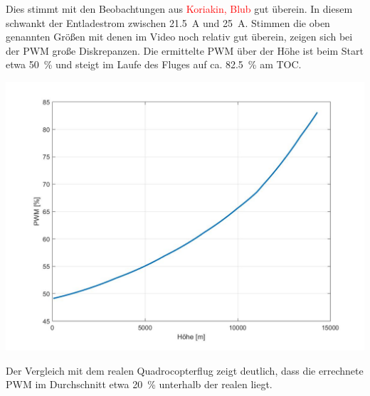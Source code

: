 Dies stimmt mit den Beobachtungen aus \textcolor{red}{Koriakin, Blub} gut überein. In diesem schwankt der Entladestrom zwischen \SI{21,5}{A} und \SI{25}{A}.
Stimmen die oben genannten Größen mit denen im Video noch relativ gut überein, zeigen sich bei der PWM große Diskrepanzen. Die ermittelte PWM über der Höhe ist beim Start etwa \SI{50}{\%} und steigt im Laufe des Fluges auf ca. \SI{82,5}{\%} am TOC. 
\begin{center}
	\includegraphics[scale=0.3]{Diagramme/PWM.jpg}
	\label{pic:pwm_russland}
\end{center}
Der Vergleich mit dem realen Quadrocopterflug zeigt deutlich, dass die errechnete PWM im Durchschnitt etwa \SI{20}{\%} unterhalb der realen liegt.


